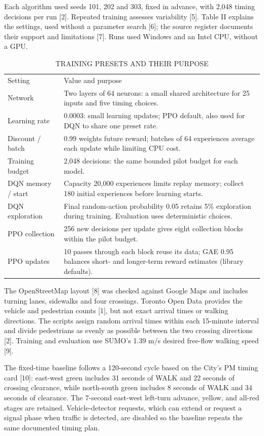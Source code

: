 \documentclass[conference]{IEEEtran}
\begin{document}
Each algorithm used seeds 101, 202 and 303, fixed in advance, with 2,048 timing decisions per run [2]. Repeated training assesses variability [5]. Table II explains the settings, used without a parameter search [6]; the source register documents their support and limitations [7]. Runs used Windows and an Intel CPU, without a GPU.

\begin{table}[ht]\centering\footnotesize
\caption{TRAINING PRESETS AND THEIR PURPOSE}
\setlength{\tabcolsep}{2pt}\begin{tabular}{p{76pt}p{168pt}}\hline
Setting & Value and purpose \\
Network & Two layers of 64 neurons: a small shared architecture for 25 inputs and five timing choices. \\
Learning rate & 0.0003: small learning updates; PPO default, also used for DQN to share one preset rate. \\
Discount / batch & 0.99 weights future reward; batches of 64 experiences average each update while limiting CPU cost. \\
Training budget & 2,048 decisions: the same bounded pilot budget for each model. \\
DQN memory / start & Capacity 20,000 experiences limits replay memory; collect 180 initial experiences before learning starts. \\
DQN exploration & Final random-action probability 0.05 retains 5\% exploration during training. Evaluation uses deterministic choices. \\
PPO collection & 256 new decisions per update gives eight collection blocks within the pilot budget. \\
PPO updates & 10 passes through each block reuse its data; GAE 0.95 balances short- and longer-term reward estimates (library defaults). \\
\hline\end{tabular}\end{table}
The OpenStreetMap layout [8] was checked against Google Maps and includes turning lanes, sidewalks and four crossings. Toronto Open Data provides the vehicle and pedestrian counts [1], but not exact arrival times or walking directions. The scripts assign random arrival times within each 15-minute interval and divide pedestrians as evenly as possible between the two crossing directions [2]. Training and evaluation use SUMO's 1.39 m/s desired free-flow walking speed [9].

The fixed-time baseline follows a 120-second cycle based on the City's PM timing card [10]: east-west green includes 31 seconds of WALK and 22 seconds of crossing clearance, while north-south green includes 8 seconds of WALK and 34 seconds of clearance. The 7-second east-west left-turn advance, yellow, and all-red stages are retained. Vehicle-detector requests, which can extend or request a signal phase when traffic is detected, are disabled so the baseline repeats the same documented timing plan.
\end{document}
